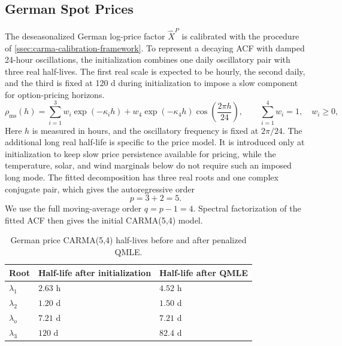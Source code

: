 \subsection{German Spot Prices}\label{ssec:german-price-carma-calibration}

The deseasonalized German log-price factor \(\widehat X^P\) is calibrated with
the procedure of \cref{ssec:carma-calibration-framework}. To represent a
decaying ACF with damped 24-hour oscillations, the initialization combines one
daily oscillatory pair with three real half-lives. The first real scale is
expected to be hourly, the second daily, and the third is fixed at 120 d during
initialization to impose a slow component for option-pricing horizons.
\begin{equation}
  \rho_{\mathrm{ms}}(h)
  =
  \sum_{i=1}^{3} w_i \exp(-\kappa_i h)
  +
  w_4 \exp(-\kappa_4 h)
  \cos\left(\frac{2\pi h}{24}\right),
  \qquad
  \sum_{i=1}^{4}w_i=1,\quad w_i\ge 0,
  \label{eq:price-multiscale-acf}
\end{equation}
Here \(h\) is measured in hours, and the oscillatory frequency is fixed at
\(2\pi/24\). The additional long real half-life is specific to the price
model. It is introduced only at initialization to keep slow price persistence
available for pricing, while the temperature, solar, and wind marginals below
do not require such an imposed long mode. The fitted decomposition has three
real roots and one complex conjugate pair, which gives the autoregressive order
\[
  p = 3 + 2 = 5 .
\]
We use the full moving-average order \(q=p-1=4\). Spectral factorization of the
fitted ACF then gives the initial CARMA(5,4) model.

\FloatBarrier

\begin{table}[!htbp]
  \centering
  \caption{German price CARMA(5,4) half-lives before and after penalized QMLE.}
  \label{tab:price-carma-half-lives}
  \begin{tabular}{@{}lll@{}}
    \toprule
    Root & Half-life after initialization & Half-life after QMLE \\
    \midrule
    \(\lambda_1\) & \(2.63\) h & \(4.52\) h \\
    \(\lambda_2\) & \(1.20\) d & \(1.50\) d \\
    \(\lambda_o\) & \(7.21\) d & \(7.21\) d \\
    \(\lambda_3\) & \(120\) d & \(82.4\) d \\
    \bottomrule
  \end{tabular}
\end{table}

